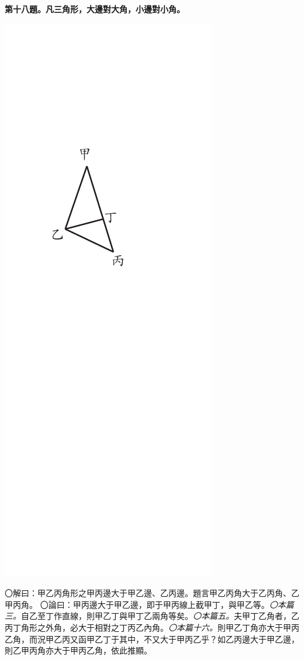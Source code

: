 \documentclass[12pt,b5paper,landscape]{article}
\newcommand{\ccom}[1]{{\footnotesize \emph{〇#1}}}
\newcommand{\bcom}[1]{〇#1}
\newcommand{\cthm}[1]{{
\vspace{8pt}

\bfseries #1}}
\begin{document}
\begin{multicols}{2}
\cthm{第十八題。凡三角形，大邊對大角，小邊對小角。}
\begin{center}
    \includegraphics[angle=90]{eu63}
\end{center}
\bcom{解曰：甲乙丙角形之甲丙邊大于甲乙邊、乙丙邊。題言甲乙丙角大于乙丙角、乙甲丙角。}
\bcom{論曰：甲丙邊大于甲乙邊，即于甲丙線上截甲丁，與甲乙等。\ccom{本篇三。}自乙至丁作直線，則甲乙丁與甲丁乙兩角等矣。\ccom{本篇五。}夫甲丁乙角者，乙丙丁角形之外角，必大于相對之丁丙乙內角。\ccom{本篇十六。}則甲乙丁角亦大于甲丙乙角，而況甲乙丙又函甲乙丁于其中，不又大于甲丙乙乎？如乙丙邊大于甲乙邊，則乙甲丙角亦大于甲丙乙角，依此推顯。}


\end{multicols}
\end{document}

